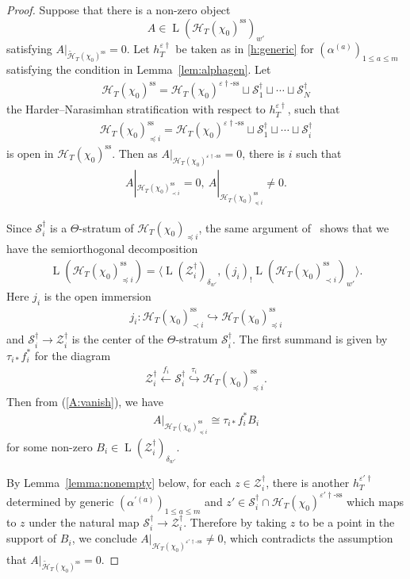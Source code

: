 \documentclass[11pt,oneside,a4paper,mathscr]{amsart}
\theoremstyle{definition}
\renewcommand{\leq}{\leqslant}
\newcommand{\cS}{\mathcal{S}}
\newcommand{\LL}{\operatorname{L}}
\newcommand{\cH}{\mathcal{H}}
\newcommand{\vd}{\varepsilon\dag}
\newcommand{\vdss}{\varepsilon\dag\text{-ss}}
\begin{document}
\begin{proof}
   Suppose that there is a non-zero object
\[
A \in \LL(\cH_T(\chi_0)^{\mathrm{ss}})_{w'}
\]
satisfying $A|_{\widetilde{\cH}_T(\chi_0)^{\mathrm{ss}}}=0$.
Let $h_{T}^{\vd}$ be taken as in \eqref{h:generic} for
$(\alpha^{(a)})_{1\leq a\leq m}$ satisfying the condition in
Lemma~\ref{lem:alphagen}. Let
    \begin{align*}
        \cH_T(\chi_0)^{\mathrm{ss}}=\cH_T(\chi_0)^{\vdss}\sqcup \cS_1^{\dag} \sqcup \cdots \sqcup \cS_{N}^{\dag} 
    \end{align*}
    the Harder--Narasimhan stratification with respect to $h_T^{\vd}$, such that 
\begin{align*}
       \cH_T(\chi_0)^{\mathrm{ss}}_{\preceq i}= \cH_T(\chi_0)^{\vdss}\sqcup \cS_1^{\dag} \sqcup \cdots \sqcup \cS_{i}^{\dag} 
\end{align*}
 is open in $\cH_T(\chi_0)^{\mathrm{ss}}$.    
 Then as $A|_{\cH_T(\chi_0)^{\vdss}}=0$, there is $i$ such that 
 \begin{align}\label{A:vanish}
     A|_{\cH_T(\chi_0)_{\prec i}^{\mathrm{ss}}}=0, \ A|_{\cH_T(\chi_0)_{\preceq i}^{\mathrm{ss}}}\neq 0.
 \end{align}

 Since $\cS_i^{\dag}$ is a $\Theta$-stratum of $\cH_T(\chi_0)_{\preceq i}$, 
 the same argument of~\cite[Proposition~8.23]{PTlim} shows that we have the 
 semiorthogonal decomposition 
 \begin{align*}
     \LL(\cH_T(\chi_0)_{\preceq i}^{\mathrm{ss}})=\langle \LL(\mathcal{Z}_i^{\dag})_{\delta_{w'}}, (j_i)_{!}\LL(\cH_T(\chi_0)^{\mathrm{ss}}_{\prec i})_{w'} \rangle.
 \end{align*}
 Here $j_i$ is the open immersion 
 \begin{align*}
     j_i \colon \cH_T(\chi_0)^{\mathrm{ss}}_{\prec i} \hookrightarrow \cH_T(\chi_0)^{\mathrm{ss}}_{\preceq i}
 \end{align*}
 and $\cS_i^{\dag} \to \mathcal{Z}_i^{\dag}$ is the center of the $\Theta$-stratum $\cS_i^{\dag}$. 
 The first summand is given by 
$\tau_{i*}f_i^*$ for the diagram 
\begin{align*}
        \mathcal{Z}_i^{\dag} \stackrel{f_i}{\leftarrow} \cS_i^{\dag} \stackrel{\tau_i}{\hookrightarrow} \cH_T(\chi_0)_{\preceq i}^{\mathrm{ss}}.
    \end{align*}
 Then from (\ref{A:vanish}), we have 
 \begin{align*}
     A|_{\cH_T(\chi_0)_{\preceq i}^{\mathrm{ss}}}\cong 
     \tau_{i*}f_i^* B_i
 \end{align*}
 for some non-zero $B_i \in \LL(\mathcal{Z}_i^{\dag})_{\delta_{w'}}$. 
 
    By Lemma~\ref{lemma:nonempty} below, for each $z\in \mathcal{Z}_i^{\dag}$, there is another $h_T^{\varepsilon'\dag}$ determined by generic $(\alpha^{'(a)})_{1\leq a\leq m}$
   and $z' \in \cS_i^{\dag} \cap \cH_T(\chi_0)^{\varepsilon'\dag\text{-ss}}$ which maps to $z$
   under the natural map $\cS_i^{\dag} \to \mathcal{Z}_i^{\dag}$. 
   Therefore by taking $z$ to be a point in the support of $B_i$, we conclude 
   $A|_{\cH_T(\chi_0)^{\varepsilon'\dag\text{-ss}}}\neq 0$, 
   which contradicts the assumption that $A|_{\widetilde{\cH}_T(\chi_0)^{\mathrm{ss}}}=0$. 
\end{proof}
\end{document}
